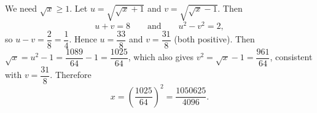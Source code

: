 We need $\sqrt x\ge1$. Let $u=\sqrt{\sqrt x+1}$ and $v=\sqrt{\sqrt x-1}$. Then
\[u+v=8\qquad\text{and}\qquad u^2-v^2=2,\]
so $u-v=\dfrac{2}{8}=\dfrac14$. Hence $u=\dfrac{33}{8}$ and $v=\dfrac{31}{8}$ (both positive). Then $\sqrt x=u^2-1=\dfrac{1089}{64}-1=\dfrac{1025}{64}$, which also gives $v^2=\sqrt x-1=\dfrac{961}{64}$, consistent with $v=\dfrac{31}8$. Therefore
\[x=\left(\dfrac{1025}{64}\right)^2=\boxed{\dfrac{1050625}{4096}}.\]
